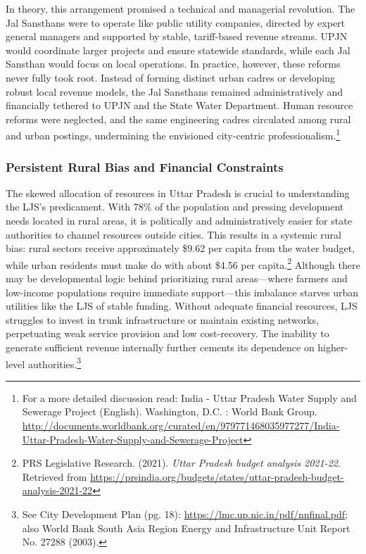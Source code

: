 In theory, this arrangement promised a technical and managerial revolution. The Jal Sansthans were to operate like public utility companies, directed by expert general managers and supported by stable, tariff-based revenue streams. UPJN would coordinate larger projects and ensure statewide standards, while each Jal Sansthan would focus on local operations. In practice, however, these reforms never fully took root. Instead of forming distinct urban cadres or developing robust local revenue models, the Jal Sansthans remained administratively and financially tethered to UPJN and the State Water Department. Human resource reforms were neglected, and the same engineering cadres circulated among rural and urban postings, undermining the envisioned city-centric professionalism.\footnote{For a more detailed discussion read: India - Uttar Pradesh Water Supply and Sewerage Project (English). Washington, D.C. : World Bank Group. \protect\url{http://documents.worldbank.org/curated/en/979771468035977277/India-Uttar-Pradesh-Water-Supply-and-Sewerage-Project}}

\subsubsection{Persistent Rural Bias and Financial Constraints}

The skewed allocation of resources in Uttar Pradesh is crucial to understanding the LJS’s predicament. With 78\% of the population and pressing development needs located in rural areas, it is politically and administratively easier for state authorities to channel resources outside cities. This results in a systemic rural bias: rural sectors receive approximately \$9.62 per capita from the water budget, while urban residents must make do with about \$4.56 per capita.\footnote{PRS Legislative Research. (2021). \textit{Uttar Pradesh budget analysis 2021-22}. Retrieved from \url{https://prsindia.org/budgets/states/uttar-pradesh-budget-analysis-2021-22}} Although there may be developmental logic behind prioritizing rural areas—where farmers and low-income populations require immediate support—this imbalance starves urban utilities like the LJS of stable funding. Without adequate financial resources, LJS struggles to invest in trunk infrastructure or maintain existing networks, perpetuating weak service provision and low cost-recovery. The inability to generate sufficient revenue internally further cements its dependence on higher-level authorities.\footnote{See City Development Plan (pg. 18): \url{https://lmc.up.nic.in/pdf/nnfinal.pdf}; also World Bank South Asia Region Energy and Infrastructure Unit Report No. 27288 (2003).}

